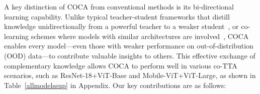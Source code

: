 



A key distinction of COCA from conventional methods is its bi-directional learning capability. Unlike typical teacher-student frameworks that distill knowledge unidirectionally from a powerful teacher to a weaker student~\cite{deng2019cluster,deng2023harmonious,hu2022teacher}, or co-learning schemes where models with similar architectures are involved~\cite{wang2022continual,dobler2023robust,zhou2023adaptive}, COCA enables every model—even those with weaker performance on out-of-distribution (OOD) data—to contribute valuable insights to others. This effective exchange of complementary knowledge allows COCA to perform well in various co-TTA scenarios, such as ResNet-18+ViT-Base and Mobile-ViT+ViT-Large, as shown in Table~\ref{allmodelssup} in Appendix. Our key contributions are as follows:

